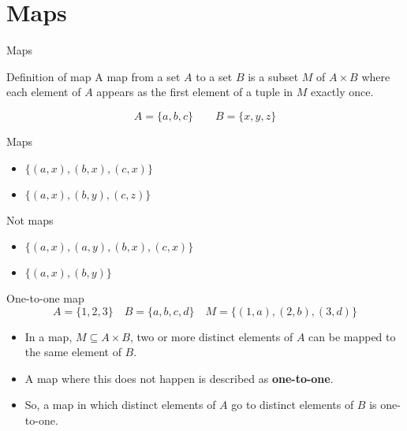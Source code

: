 \documentclass{beamer}
\newenvironment{topdisp}{\color{gmitred}\vspace{-4mm}}{\vspace{-4mm}}
\begin{document}
\section{Maps}

\begin{frame}{Maps}

  \begin{alertblock}{Definition of map}
    A map from a set $A$ to a set $B$ is a subset $M$ of $A \times B$ where each element of $A$ appears as the first element of a tuple in $M$ exactly once.
  \end{alertblock}

  \begin{topdisp}
    $$A = \{a,b,c\} \qquad B = \{x,y,z\}$$
  \end{topdisp}

  \begin{minipage}[t]{0.48\linewidth}
  \begin{exampleblock}{Maps}
    \begin{itemize}
      \item $\{(a,x),(b,x),(c,x)\}$
      \item $\{(a,x),(b,y),(c,z)\}$
    \end{itemize}
  \end{exampleblock}
\end{minipage}
\begin{minipage}[t]{0.48\linewidth}
  \begin{exampleblock}{Not maps}
    \begin{itemize}
      \item $\{(a,x),(a,y),(b,x),(c,x)\}$
      \item $\{(a,x),(b,y)\}$
    \end{itemize}
  \end{exampleblock}
\end{minipage}
\end{frame}


\begin{frame}{One-to-one map}
  \begin{topdisp}
    $$ A = \{1,2,3\} \quad  B = \{a,b,c,d\} \quad  M = \{ (1,a), (2,b), (3,d) \} $$
  \end{topdisp}
  \begin{itemize}
    \setlength\itemsep{3mm}
    \item In a map, $M \subseteq A \times B$, two or more distinct elements of $A$ can be mapped to the same element of $B$.
    \item A map where this does not happen is described as \textbf{one-to-one}.
    \item So, a map in which distinct elements of $A$ go to distinct elements of $B$ is one-to-one.
  \end{itemize}
\end{frame}
\end{document}
